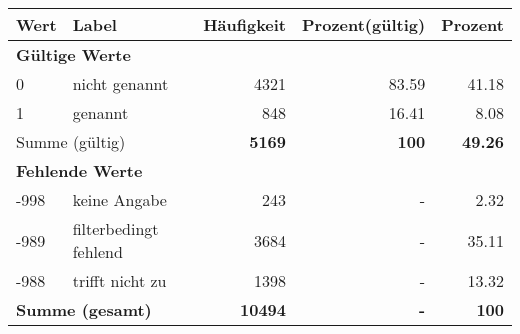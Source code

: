      \begin{longtable}{lXrrr}
     \toprule
     \textbf{Wert} & \textbf{Label} & \textbf{Häufigkeit} & \textbf{Prozent(gültig)} & \textbf{Prozent} \\
     \endhead
     \midrule
     \multicolumn{5}{l}{\textbf{Gültige Werte}}\\

     0 &
     \multicolumn{1}{X}{ nicht genannt   } &


       \num{4321} &
       \num[round-mode=places,round-precision=2]{83,59} &
         \num[round-mode=places,round-precision=2]{41,18} \\

     1 &
     \multicolumn{1}{X}{ genannt   } &


       \num{848} &
       \num[round-mode=places,round-precision=2]{16,41} &
         \num[round-mode=places,round-precision=2]{8,08} \\
     \midrule
     \multicolumn{2}{l}{Summe (gültig)} &
       \textbf{\num{5169}} &
     \textbf{100} &
       \textbf{\num[round-mode=places,round-precision=2]{49,26}} \\
     \multicolumn{5}{l}{\textbf{Fehlende Werte}}\\
       -998 &
       keine Angabe &
         \num{243} &
        - &
         \num[round-mode=places,round-precision=2]{2,32} \\
       -989 &
       filterbedingt fehlend &
         \num{3684} &
        - &
         \num[round-mode=places,round-precision=2]{35,11} \\
       -988 &
       trifft nicht zu &
         \num{1398} &
        - &
         \num[round-mode=places,round-precision=2]{13,32} \\
     \midrule
     \multicolumn{2}{l}{\textbf{Summe (gesamt)}} &
          \textbf{\num{10494}} &
        \textbf{-} &
        \textbf{100} \\
     \bottomrule
     \end{longtable}
     
